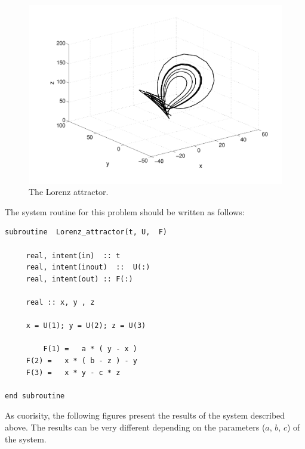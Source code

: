\begin{figure}[H]
\centering
\includegraphics[scale=0.4, trim = 20mm 0mm 0mm 0mm, clip]
{./Figures/2-CauchyProblem/lorentz_3.pdf}
\caption{The Lorenz attractor.}
\end{figure}

The system routine for this problem should be written as follows: 

\begin{blueframed}
\begin{lstlisting}
subroutine  Lorenz_attractor(t, U,  F)        
    
     real, intent(in)  :: t
     real, intent(inout)  ::  U(:)
     real, intent(out) :: F(:)
      
     real :: x, y , z
	  
	 x = U(1); y = U(2); z = U(3)   

    	 F(1) =   a * ( y - x ) 
	 F(2) =   x * ( b - z ) - y 
	 F(3) =   x * y - c * z   

end subroutine 
\end{lstlisting}
\end{blueframed} 


As cuorisity, the following figures present the results of the system described
above. The results can be very different depending on the parameters ($a$, $b$,
$c$) of the system. 

